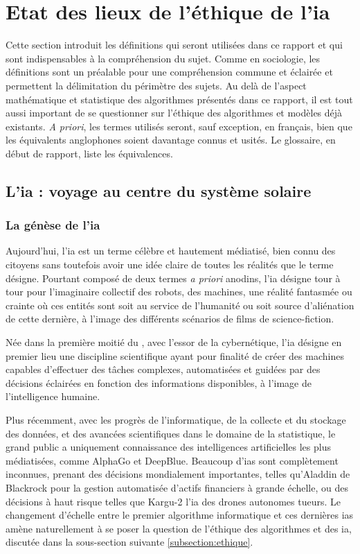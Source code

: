 \section{Etat des lieux de l'éthique de l'\gls{ia}}

Cette section introduit les définitions qui seront utilisées dans ce rapport et qui sont indispensables à la compréhension du sujet. Comme en sociologie, les définitions sont un préalable pour une compréhension commune et éclairée et permettent la délimitation du périmètre des sujets. Au delà de l'aspect mathématique et statistique des algorithmes présentés dans ce rapport, il est tout aussi important de se questionner sur l'éthique des algorithmes et modèles déjà existants. \textit{A priori}, les termes utilisés seront, sauf exception, en français, bien que les équivalents anglophones soient davantage connus et usités. Le glossaire, en début de rapport, liste les équivalences.

\subsection{L'\gls{ia} : voyage au centre du système solaire}

\subsubsection{La génèse de l'\gls{ia}}
Aujourd'hui, l'\gls{ia} est un terme célèbre et hautement médiatisé, bien connu des citoyens sans toutefois avoir une idée claire de toutes les réalités que le terme désigne. Pourtant composé de deux termes \textit{a priori} anodins, l'\gls{ia} désigne tour à tour pour l'imaginaire collectif des robots, des machines, une réalité fantasmée ou crainte où ces entités sont soit au service de l'humanité ou soit source d'aliénation de cette dernière, à l'image des différents scénarios de films de science-fiction.


Née dans la première moitié du , avec l'essor de la cybernétique, l'\gls{ia} désigne en premier lieu une discipline scientifique ayant pour finalité de créer des machines capables d'effectuer des tâches complexes, automatisées et guidées par des décisions éclairées en fonction des informations disponibles, à l'image de l'intelligence humaine.

Plus récemment, avec les progrès de l'informatique, de la collecte et du stockage des données, et des avancées scientifiques dans le domaine de la statistique, le grand public a uniquement connaissance des intelligences artificielles les plus médiatisées, comme AlphaGo et DeepBlue. Beaucoup d'\glspl{ia} sont complètement inconnues, prenant des décisions mondialement importantes, telles qu'Aladdin de Blackrock pour la gestion automatisée d'actifs financiers à grande échelle, ou des décisions à haut risque telles que Kargu-2 l'\gls{ia} des drones autonomes tueurs. Le changement d'échelle entre le premier algorithme informatique et ces dernières \glspl{ia} amène naturellement à se poser la question de l'éthique des algorithmes et des \gls{ia}, discutée dans la sous-section suivante \ref{subsection:ethique}.


